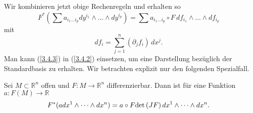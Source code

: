 \documentclass[a4paper,twoside,DIV15,BCOR12mm]{scrbook}
\begin{document}
\bigskip

\noindent
Wir kombinieren jetzt obige Rechenregeln und erhalten so
\begin{equation}\label{3.4.2}
F^{*}\left( \sum a_{i_{1} \dots i_{p}} dy^{i_1} \wedge \dots \wedge dy^{i_p}\right)
 = \sum a_{i_{1} \dots i_{p}} \circ F \, df_{i_1} \wedge \dots \wedge df_{i_p} \end{equation}
mit
\begin{equation}\label{3.4.3}
df_{i} = \sum_{j=1}^{n}(\partial_{j}f_{i}) \, dx^{j}.
\end{equation}
Man kann (\ref{3.4.3}) in (\ref{3.4.2}) einsetzen, um eine Darstellung bezüglich der Standardbasis zu erhalten. Wir betrachten explizit nur den folgenden Spezialfall.

\bigskip

\begin{satz}\label{Satz3.4.2} {Sei $M \subset {\mathbb R}^{n}$ offen 
und $F: M \to {\mathbb R}^{n}$ differenzierbar. Dann ist für eine Funktion 
$a: F(M) \to {\mathbb R}$} 
\[ F^{*}(adx^{1} \wedge \dots \wedge dx^{n}) = a \circ F {\rm det}\, 
(JF) \, dx^{1} \wedge \dots \wedge dx^{n}. \]
\end{satz}

\bigskip
\end{document}
